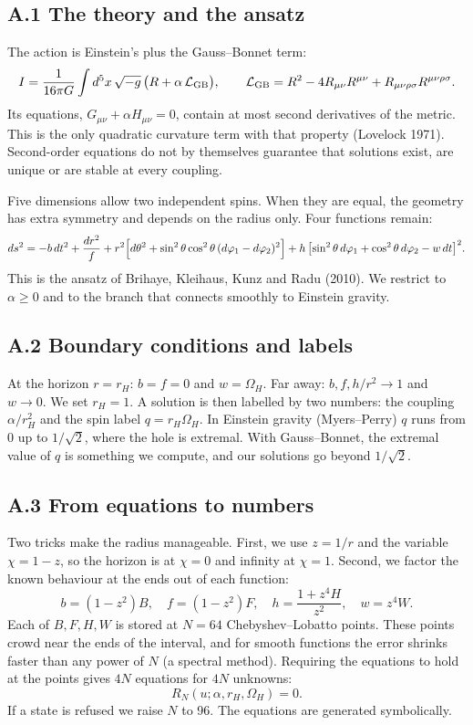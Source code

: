 \documentclass[12pt,a4paper]{article}
\begin{document}
\subsection*{A.1 The theory and the ansatz}

The action is Einstein's plus the Gauss--Bonnet term:
\[
I=\frac{1}{16\pi G}\int d^5x\,\sqrt{-g}\,\bigl(R+\alpha\,\mathcal L_{\rm GB}\bigr),\qquad
\mathcal L_{\rm GB}=R^2-4R_{\mu\nu}R^{\mu\nu}+R_{\mu\nu\rho\sigma}R^{\mu\nu\rho\sigma}.
\]
Its equations, $G_{\mu\nu}+\alpha H_{\mu\nu}=0$, contain at most second derivatives
of the metric. This is the only quadratic curvature term with that property
(Lovelock 1971). Second-order equations do not by themselves guarantee that
solutions exist, are unique or are stable at every coupling.

Five dimensions allow two independent spins. When they are equal, the geometry has
extra symmetry and depends on the radius only. Four functions remain:
\[
ds^2=-b\,dt^2+\frac{dr^2}{f}+r^2\Bigl[d\theta^2+\sin^2\theta\cos^2\theta\,(d\varphi_1-d\varphi_2)^2\Bigr]
+h\,\bigl[\sin^2\theta\,d\varphi_1+\cos^2\theta\,d\varphi_2-w\,dt\bigr]^2 .
\]
This is the ansatz of Brihaye, Kleihaus, Kunz and Radu (2010). We restrict to
$\alpha\ge0$ and to the branch that connects smoothly to Einstein gravity.

\subsection*{A.2 Boundary conditions and labels}

At the horizon $r=r_H$: $b=f=0$ and $w=\Omega_H$. Far away: $b,f,h/r^2\to1$ and
$w\to0$. We set $r_H=1$. A solution is then labelled by two numbers: the coupling
$\alpha/r_H^2$ and the spin label $q=r_H\Omega_H$. In Einstein gravity
(Myers--Perry) $q$ runs from 0 up to $1/\sqrt2$, where the hole is extremal. With
Gauss--Bonnet, the extremal value of $q$ is something we compute, and our solutions
go beyond $1/\sqrt2$.

\subsection*{A.3 From equations to numbers}

Two tricks make the radius manageable. First, we use $z=1/r$ and the variable
$\chi=1-z$, so the horizon is at $\chi=0$ and infinity at $\chi=1$. Second, we
factor the known behaviour at the ends out of each function:
\[
b=(1-z^2)B,\quad f=(1-z^2)F,\quad h=\frac{1+z^4H}{z^2},\quad w=z^4W .
\]
Each of $B,F,H,W$ is stored at $N=64$ Chebyshev--Lobatto points. These points crowd
near the ends of the interval, and for smooth functions the error shrinks faster
than any power of $N$ (a spectral method). Requiring the equations to hold at the
points gives $4N$ equations for $4N$ unknowns:
\[
R_N(u;\alpha,r_H,\Omega_H)=0 .
\]
If a state is refused we raise $N$ to 96. The equations are generated symbolically.
\end{document}

